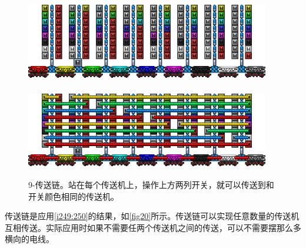\begin{figure}[!ht]
\centering
\includegraphics[width=0.95\textwidth]{images/381.png}\\
\mbox{}\\
\includegraphics[width=0.95\textwidth]{images/382.png}
\caption{9-传送链。站在每个传送机上，操作上方两列开关，就可以传送到和开关颜色相同的传送机。}\label{fig20}
\end{figure}

传送链是应用\autoref{i249:250}的结果，如\autoref{fig20}所示。传送链可以实现任意数量的传送机互相传送。实际应用时如果不需要任两个传送机之间的传送，可以不需要摆那么多横向的电线。

